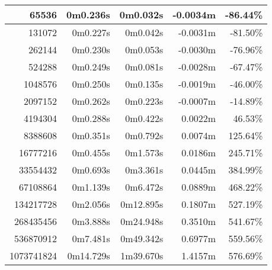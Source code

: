 \documentclass[documentation.tex]{subfiles}
\begin{document}
\begin{longtable}{|r|r|r|r|r|}
    65536               & 0m0.236s          & 0m0.032s          & {\color[HTML]{FF0000} -0.0034m} & {\color[HTML]{FF0000} -86.44\%} \\ \hline
    131072              & 0m0.227s          & 0m0.042s          & {\color[HTML]{FF0000} -0.0031m} & {\color[HTML]{FF0000} -81.50\%} \\ \hline
    262144              & 0m0.230s          & 0m0.053s          & {\color[HTML]{FF0000} -0.0030m} & {\color[HTML]{FF0000} -76.96\%} \\ \hline
    524288              & 0m0.249s          & 0m0.081s          & {\color[HTML]{FF0000} -0.0028m} & {\color[HTML]{FF0000} -67.47\%} \\ \hline
    1048576             & 0m0.250s          & 0m0.135s          & {\color[HTML]{FF0000} -0.0019m} & {\color[HTML]{FF0000} -46.00\%} \\ \hline
    2097152             & 0m0.262s          & 0m0.223s          & {\color[HTML]{FF0000} -0.0007m} & {\color[HTML]{FF0000} -14.89\%} \\ \hline
    4194304             & 0m0.288s          & 0m0.422s          & {\color[HTML]{32CB00} 0.0022m}  & {\color[HTML]{32CB00} 46.53\%}  \\ \hline
    8388608             & 0m0.351s          & 0m0.792s          & {\color[HTML]{32CB00} 0.0074m}  & {\color[HTML]{32CB00} 125.64\%} \\ \hline
    16777216            & 0m0.455s          & 0m1.573s          & {\color[HTML]{32CB00} 0.0186m}  & {\color[HTML]{32CB00} 245.71\%} \\ \hline
    33554432            & 0m0.693s          & 0m3.361s          & {\color[HTML]{32CB00} 0.0445m}  & {\color[HTML]{32CB00} 384.99\%} \\ \hline
    67108864            & 0m1.139s          & 0m6.472s          & {\color[HTML]{32CB00} 0.0889m}  & {\color[HTML]{32CB00} 468.22\%} \\ \hline
    134217728           & 0m2.056s          & 0m12.895s         & {\color[HTML]{32CB00} 0.1807m}  & {\color[HTML]{32CB00} 527.19\%} \\ \hline
    268435456           & 0m3.888s          & 0m24.948s         & {\color[HTML]{32CB00} 0.3510m}  & {\color[HTML]{32CB00} 541.67\%} \\ \hline
    536870912           & 0m7.481s          & 0m49.342s         & {\color[HTML]{32CB00} 0.6977m}  & {\color[HTML]{32CB00} 559.56\%} \\ \hline
    1073741824          & 0m14.729s         & 1m39.670s         & {\color[HTML]{32CB00} 1.4157m}  & {\color[HTML]{32CB00} 576.69\%} \\ \hline

\end{longtable}
\end{document}
